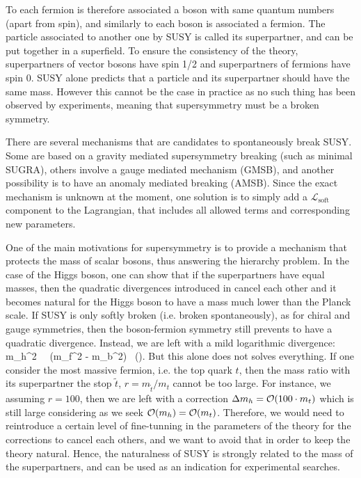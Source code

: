         To each fermion is therefore associated a boson with same quantum numbers (apart
        from spin), and similarly to each boson
        is associated a fermion. The particle associated to another one by SUSY is called
        its superpartner, and can be put together in a superfield. To ensure the consistency
        of the theory, superpartners of vector bosons have spin 1/2 and superpartners
        of fermions have spin 0. SUSY alone predicts that a particle and its superpartner
        should have the same mass. However this cannot be the case in practice as no
        such thing has been observed by experiments, meaning that supersymmetry must be
        a broken symmetry.

        There are several mechanisms that are candidates to spontaneously break SUSY. Some
        are based on a gravity mediated supersymmetry breaking (such as minimal SUGRA),
        others involve a gauge mediated mechanism (GMSB), and another possibility is to
        have an anomaly mediated breaking (AMSB). Since the exact mechanism is unknown at
        the moment, one solution is to simply add a $\mathcal{L}_\text{soft}$ component to
        the Lagrangian, that includes all allowed terms and corresponding new parameters.

        One of the main motivations for supersymmetry is to provide a mechanism that
        protects the mass of scalar bosons, thus answering the hierarchy problem. In the
        case of the Higgs boson, one can show
        that if the superpartners have equal masses, then the quadratic divergences
        introduced in  cancel each other and
        it becomes natural for the Higgs boson to have a mass much lower than the Planck scale.
        If SUSY is only softly broken (i.e. broken spontaneously), as for chiral and gauge
        symmetries, then the boson-fermion symmetry still prevents to have a quadratic
        divergence. Instead, we are left with a mild logarithmic divergence:
        {
            \Delta m_h^2 \, \propto \, (m_f^2 - m_b^2) \, \left(\right).
        }
        But this alone does not solves everything. If one consider the most massive
        fermion, i.e. the top quark $t$, then the mass ratio with its superpartner the
        stop $\tilde{t}$, $r = m_{\tilde{t}} / m_t$ cannot be too large. For instance,
        we assuming $r = 100$, then we are left with a correction $\Delta m_h = \mathcal{O}(100 \cdot m_t)$
        which is still large considering as we seek $\mathcal{O}(m_h) = \mathcal{O}(m_t)$.
        Therefore, we would need to reintroduce a certain level of fine-tunning in the
        parameters of the theory for the corrections to cancel each others, and we want
        to avoid that in order to keep the theory natural. Hence, the naturalness of SUSY
        is strongly related to the mass of the superpartners, and can be used as an indication
        for experimental searches.

